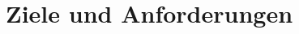 \section{Ziele und Anforderungen}
\label{sec:Fallbeispiel} \label{sec:TaxiAllgemein} \label{sec:Allgemein}